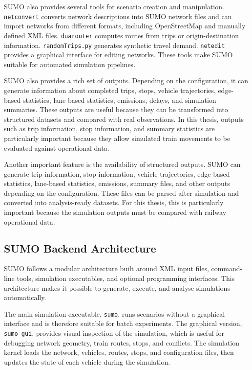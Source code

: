 SUMO also provides several tools for scenario creation and manipulation. \texttt{netconvert} converts network descriptions 
into SUMO network files and can import networks from different formats, including OpenStreetMap and manually defined XML 
files. \texttt{duarouter} computes routes from trips or origin-destination information. \texttt{randomTrips.py} generates 
synthetic travel demand. \texttt{netedit} provides a graphical interface for editing networks. These tools make SUMO 
suitable for automated simulation pipelines.

SUMO also provides a rich set of outputs. Depending on the configuration, it can generate information about completed 
trips, stops, vehicle trajectories, edge-based statistics, lane-based statistics, emissions, delays, and simulation 
summaries. These outputs are useful because they can be transformed into structured datasets and compared with real 
observations. In this thesis, outputs such as trip information, stop information, and summary statistics are particularly 
important because they allow simulated train movements to be evaluated against operational data.

Another important feature is the availability of structured outputs. SUMO can generate trip information, stop information, 
vehicle trajectories, edge-based statistics, lane-based statistics, emissions, summary files, and other outputs depending 
on the configuration. These files can be parsed after simulation and converted into analysis-ready datasets. For this 
thesis, this is particularly important because the simulation outputs must be compared with railway operational data.

\subsection{SUMO Backend Architecture}
SUMO follows a modular architecture built around XML input files, command-line tools, simulation executables, and optional 
programming interfaces. This architecture makes it possible to generate, execute, and analyse simulations automatically.

The main simulation executable, \texttt{sumo}, runs scenarios without a graphical interface and is therefore suitable for 
batch experiments. The graphical version, \texttt{sumo-gui}, provides visual inspection of the simulation, which is useful 
for debugging network geometry, train routes, stops, and conflicts. The simulation kernel loads the network, vehicles, 
routes, stops, and configuration files, then updates the state of each vehicle during the simulation.

